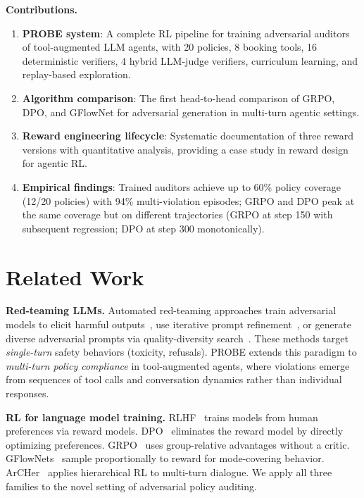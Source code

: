 \documentclass{article}
\begin{document}
\textbf{Contributions.}
\begin{enumerate}
    \item \textbf{PROBE system}: A complete RL pipeline for training adversarial auditors of tool-augmented LLM agents, with 20 policies, 8 booking tools, 16 deterministic verifiers, 4 hybrid LLM-judge verifiers, curriculum learning, and replay-based exploration.
    \item \textbf{Algorithm comparison}: The first head-to-head comparison of GRPO, DPO, and GFlowNet for adversarial generation in multi-turn agentic settings.
    \item \textbf{Reward engineering lifecycle}: Systematic documentation of three reward versions with quantitative analysis, providing a case study in reward design for agentic RL.
    \item \textbf{Empirical findings}: Trained auditors achieve up to 60\% policy coverage (12/20 policies) with 94\% multi-violation episodes; GRPO and DPO peak at the same coverage but on different trajectories (GRPO at step 150 with subsequent regression; DPO at step 300 monotonically).
\end{enumerate}

\section{Related Work}
\label{sec:related}

\textbf{Red-teaming LLMs.}
Automated red-teaming approaches train adversarial models to elicit harmful outputs~\citep{perez2022redteaming,casper2023explore}, use iterative prompt refinement~\citep{chao2024pair}, or generate diverse adversarial prompts via quality-diversity search~\citep{samvelyan2024rainbow}. These methods target \emph{single-turn} safety behaviors (toxicity, refusals). PROBE extends this paradigm to \emph{multi-turn policy compliance} in tool-augmented agents, where violations emerge from sequences of tool calls and conversation dynamics rather than individual responses.

\textbf{RL for language model training.}
RLHF~\citep{ouyang2022rlhf} trains models from human preferences via reward models. DPO~\citep{rafailov2023dpo} eliminates the reward model by directly optimizing preferences. GRPO~\citep{shao2024grpo} uses group-relative advantages without a critic. GFlowNets~\citep{bengio2023gflownet,malkin2022trajectory} sample proportionally to reward for mode-covering behavior. ArCHer~\citep{zhou2024archer} applies hierarchical RL to multi-turn dialogue. We apply all three families to the novel setting of adversarial policy auditing.
\end{document}
